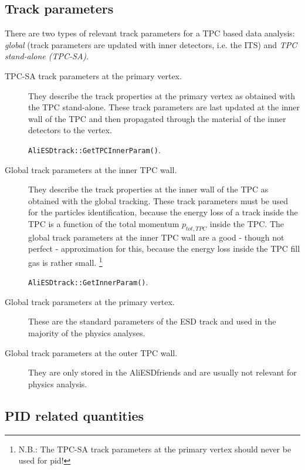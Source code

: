 \documentclass[12pt]{article}
\begin{document}
\subsection{Track parameters}

There are two types of relevant track parameters for a TPC based data analysis: {\it global} (track parameters are updated with inner detectors, i.e. the ITS) and {\it TPC stand-alone (TPC-SA)}.

	\begin{description}
	
	\item[TPC-SA track parameters at the primary vertex.] They describe the track properties at the primary vertex as obtained with the TPC stand-alone. These track parameters are last updated at the inner wall of the TPC and then propagated through the material of the inner detectors to the vertex.

\medskip
		{\tt AliESDtrack::GetTPCInnerParam()}.
\medskip
	

	\item[Global track parameters at the inner TPC wall.] They describe the track properties at the inner wall of the TPC as obtained with the global tracking. These track parameters must be used for the particles identification, because the energy loss of a track inside the TPC is a function of the total momentum $p_{tot,TPC}$ inside the TPC. The global track parameters at the inner TPC wall are a good - though not perfect - approximation for this, because the energy loss inside the TPC fill gas is rather small. \footnote{N.B.: The TPC-SA track parameters at the primary vertex should never be used for pid!}
	
\medskip
		{\tt AliESDtrack::GetInnerParam()}.
\medskip

	
	\item[Global track parameters at the primary vertex.] These are the standard parameters of the ESD track and used in the majority of the physics analyses.
	
		
	\item[Global track parameters at the outer TPC wall.] They are only stored in the AliESDfriends and are usually not relevant for physics analysis.
		
	\end{description}

\subsection{PID related quantities}
\end{document}
